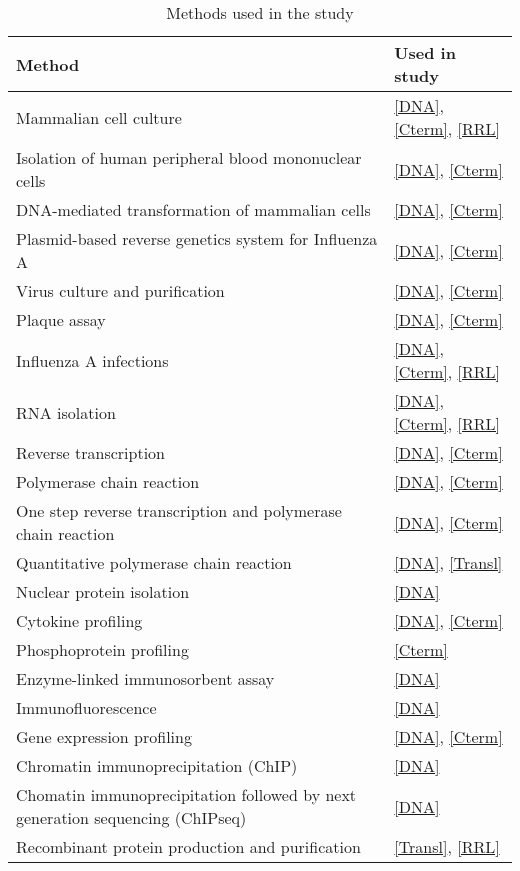 	\begin{table}[h!] 
	\caption{Methods used in the study} \label{tab:methods}
		\begin{tabu} to \linewidth {X[8,l] X[2,c]}
		\hline \textbf{Method} & \textbf{Used in study} \\ 
		\hline Mammalian cell culture & \ref*{DNA}, \ref*{Cterm}, \ref*{RRL} \\
		\hline Isolation of human peripheral blood mononuclear cells & \ref*{DNA}, \ref*{Cterm} \\
		\hline DNA-mediated transformation of mammalian cells & \ref*{DNA}, \ref*{Cterm}\\
		\hline Plasmid-based reverse genetics system for Influenza A & \ref*{DNA}, \ref*{Cterm} \\
		\hline Virus culture and purification & \ref*{DNA}, \ref*{Cterm} \\ 
		\hline Plaque assay & \ref*{DNA}, \ref*{Cterm} \\
		\hline Influenza A infections & \ref*{DNA}, \ref*{Cterm}, \ref*{RRL} \\ 
		\hline RNA isolation & \ref*{DNA}, \ref*{Cterm}, \ref*{RRL} \\
		\hline Reverse transcription & \ref*{DNA}, \ref*{Cterm} \\
		\hline Polymerase chain reaction & \ref*{DNA}, \ref*{Cterm} \\
		\hline One step reverse transcription and polymerase chain reaction & \ref*{DNA}, \ref*{Cterm} \\
		\hline Quantitative polymerase chain reaction & \ref*{DNA}, \ref*{Transl} \\
		\hline Nuclear protein isolation & \ref*{DNA} \\
		\hline Cytokine profiling & \ref*{DNA}, \ref*{Cterm} \\
		\hline Phosphoprotein profiling & \ref*{Cterm} \\
		\hline Enzyme-linked immunosorbent assay & \ref*{DNA} \\
		\hline Immunofluorescence & \ref*{DNA} \\ 
		\hline Gene expression profiling & \ref*{DNA}, \ref*{Cterm} \\
		\hline Chromatin immunoprecipitation (ChIP)& \ref*{DNA}\\
		\hline Chomatin immunoprecipitation followed by next generation sequencing (ChIPseq) & \ref*{DNA}\\
		\hline Recombinant protein production and purification & \ref*{Transl}, \ref*{RRL} \\

\end{tabu}
\end{table}

